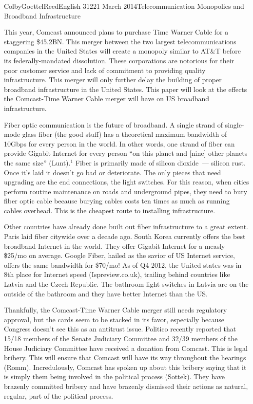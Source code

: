\documentclass[12pt]{article}
\begin{document}
\begin{mla}{Colby}{Goettel}{Reed}{English 312}{21 March 2014}{Telecommunication Monopolies and Broadband Infrastructure}

This year, Comcast announced plans to purchase Time Warner Cable for a staggering \$45.2BN. This merger between the two largest telecommunications companies in the United States will create a monopoly similar to AT\&T before its federally-mandated dissolution. These corporations are notorious for their poor customer service and lack of commitment to providing quality infrastructure. This merger will only further delay the building of proper broadband infrastructure in the United States. This paper will look at the effects the Comcast-Time Warner Cable merger will have on US broadband infrastructure.

Fiber optic communication is the future of broadband. A single strand of single-mode glass fiber (the good stuff) has a theoretical maximum bandwidth of 10\thinspace Gbps for every person in the world. In other words, one strand of fiber can provide Gigabit Internet for every person ``on this planet and [nine] other planets the same size'' (Lunt).$^1$ Fiber is primarily made of silicon dioxide~--- silicon rust. Once it's laid it doesn't go bad or deteriorate. The only pieces that need upgrading are the end connections, the light switches. For this reason, when cities perform routine maintenance on roads and underground pipes, they need to bury fiber optic cable because burying cables costs ten times as much as running cables overhead. This is the cheapest route to installing infrastructure.

Other countries have already done built out fiber infrastructure to a great extent. Paris laid fiber citywide over a decade ago. South Korea currently offers the best broadband Internet in the world. They offer Gigabit Internet for a measly \$25/mo on average. Google Fiber, hailed as the savior of US Internet service, offers the same bandwidth for \$70/mo! As of Q4 2012, the United states was in 8th place for Internet speed (Ispreview.co.uk), trailing behind countries like Latvia and the Czech Republic. The bathroom light switches in Latvia are on the outside of the bathroom and they have better Internet than the US.

Thankfully, the Comcast-Time Warner Cable merger still needs regulatory approval, but the cards seem to be stacked in its favor, especially because Congress doesn't see this as an antitrust issue. Politico recently reported that 15/18 members of the Senate Judiciary Committee and 32/39 members of the House Judiciary Committee have received a donation from Comcast. This is legal bribery. This will ensure that Comcast will have its way throughout the hearings (Romm). Incredulously, Comcast has spoken up about this bribery saying that it is simply them being involved in the political process (Sottek). They have brazenly committed bribery and have brazenly dismissed their actions as natural, regular, part of the political process.


\end{mla}
\end{document}
